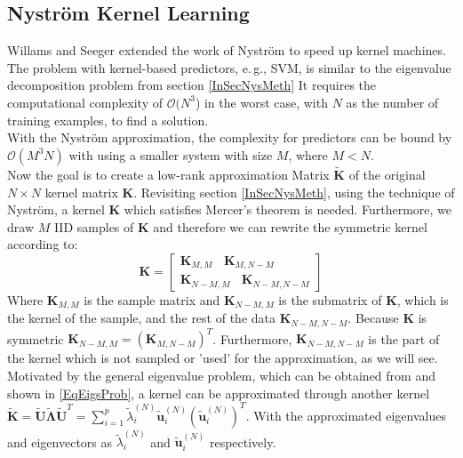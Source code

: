 \subsection{Nyström Kernel Learning}\label{InSubSecNyKerneLearning}
Willams and Seeger extended the work of Nyström to speed up kernel machines.
The problem with kernel-based predictors, e.\,g., \acs{SVM}, is similar to the eigenvalue decomposition problem from section \ref{InSecNysMeth}
It requires the computational complexity of $\mathcal{O}(N^3$) in the worst case, with $N$ as the number of training examples, to find a solution.\cite{Williams.2000}\\
With the Nyström approximation, the complexity for predictors can be bound by $\mathcal{O}(M^3N)$ with using a smaller system with size $M$, where $M<N$.\cite{Williams.2000}\\	
Now the goal is to create a low-rank approximation Matrix $\tilde{\mathbf{K}}$ of the original $N\times N$ kernel matrix $\mathbf{K}$.
Revisiting section \ref{InSecNysMeth}, using the technique of Nyström, a kernel $\mathbf{K}$ which satisfies Mercer's theorem is needed.\cite{Williams.2000}
Furthermore, we draw $M$ \acs{IID} samples of $\mathbf{K}$ and therefore we can rewrite the symmetric kernel according to:\cite{Nemtsov.2016}
\begin{equation}\label{EqNystKernelParts}
	\mathbf{K} = 
	\begin{bmatrix}
		 \mathbf{K}_{M,M}\>\>\>\> \mathbf{K}_{M,N-M} \\
		 \mathbf{K}_{N-M,M}\>\>\>\> \mathbf{K}_{N-M,N-M}
	\end{bmatrix}
\end{equation}
Where $\mathbf{K}_{M,M}$ is the sample matrix and $\mathbf{K}_{N-M,M}$ is the submatrix of $\mathbf{K}$, which is the kernel of the sample, and the rest of the data $\mathbf{K}_{N-M,N-M}$.
Because $\mathbf{K}$ is symmetric $\mathbf{K}_{N-M,M} = (\mathbf{K}_{M,N-M})^T$.
Furthermore, $\mathbf{K}_{N-M,N-M}$ is the part of the kernel which is not sampled or 'used' for the approximation, as we will see.\\
Motivated by the general eigenvalue problem, which can be obtained from \cite[p. 221]{Hartmann.2015} and shown in \eqref{EqEigsProb}, a kernel can be approximated through another kernel $\tilde{\mathbf{K}} = \tilde{\mathbf{U}}\tilde{\mathbf{\Lambda}}\tilde{\mathbf{U}}^T=\sum_{i=1}^{p}\tilde{\lambda}_i^{(N)}\tilde{\mathbf{u}}_i^{(N)}(\tilde{\mathbf{u}}_i^{(N)})^T$.\cite{Williams.2000}
With the approximated eigenvalues and eigenvectors as $\tilde{\lambda}_i^{(N)}$ and $\tilde{\mathbf{u}}_i^{(N)}$ respectively.\\
